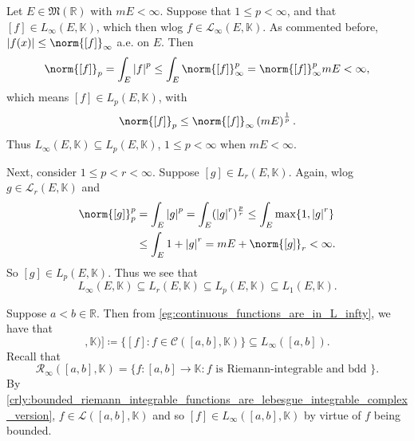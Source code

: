 \documentclass[notoc,notitlepage]{tufte-book}
\begin{document}
\begin{remark}\label{remark:containment_of_lp_spaces}
  Let $E \in \mathfrak{M}(\mathbb{R})$ with $mE < \infty$.
  Suppose that $1 \leq p < \infty$,
  and that $[f] \in L_\infty(E, \mathbb{K})$,
  which then wlog $f \in \mathcal{L}_\infty(E, \mathbb{K})$.
  As commented before, $\abs{f(x)} \leq \norm{[f]}_{\infty}$ a.e. on $E$.
  Then
  \begin{equation*}
    \norm{[f]}_p = \int_{E} \abs{f}^p
                \leq \int_{E} \norm{[f]}_{\infty}^{p}
                = \norm{[f]}_{\infty}^p mE < \infty,
  \end{equation*}
  which means $[f] \in L_p(E, \mathbb{K})$, with
  \begin{equation*}
    \norm{[f]}_p \leq \norm{[f]}_{\infty} \left( mE \right)^{\frac{1}{p}}.
  \end{equation*}
  Thus $L_\infty(E, \mathbb{K}) \subseteq L_p(E, \mathbb{K})$,
  $1 \leq p < \infty$ when $mE < \infty$.

  Next, consider $1 \leq p < r < \infty$.
  Suppose $[g] \in L_r(E, \mathbb{K})$.
  Again, wlog $g \in \mathcal{L}_r(E, \mathbb{K})$ and
  \begin{align*}
    \norm{[g]}_p^p &= \int_{E} \abs{g}^p = \int_{E} (\abs{g}^r)^{\frac{p}{r}}
                 \leq \int_{E} \max \{ 1, \abs{g}^r \} \\
                 &\leq \int_{E} 1 + \abs{g}^r = mE + \norm{[g]}_r < \infty.
  \end{align*}
  So $[g] \in L_p(E, \mathbb{K})$. Thus we see that
  \begin{equation*}
    L_\infty(E, \mathbb{K}) \subseteq L_r (E, \mathbb{K})
              \subseteq L_p(E, \mathbb{K}) \subseteq L_1(E, \mathbb{K}).
  \end{equation*}
\end{remark}

\begin{remark}
  Suppose $a < b \in \mathbb{R}$. Then from
  \cref{eg:continuous_functions_are_in_L_infty}, we have that
  \begin{equation*}
    [\mathcal{C}([a, b], \mathbb{K})]
    \coloneqq \{ [f] : f \in \mathcal{C}([a, b], \mathbb{K}) \}
    \subseteq L_\infty([a, b]).
  \end{equation*}
  Recall that
  \begin{equation*}
    \mathcal{R}_{\infty}([a, b], \mathbb{K})
    = \{ f : [a, b] \to \mathbb{K} : f \text{ is Riemann-integrable and bdd }
    \}.
  \end{equation*}
  By
  \cref{crly:bounded_riemann_integrable_functions_are_lebesgue_integrable_complex_version}, 
  $f \in \mathcal{L}([a, b], \mathbb{K})$ and so $[f] \in L_\infty([a, b],
  \mathbb{K})$ by virtue of $f$ being bounded.
\end{remark}
\end{document}
